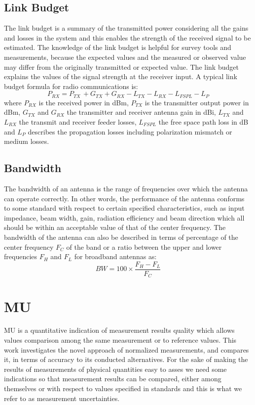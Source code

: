 \subsection{Link Budget}
The link budget is a summary of the transmitted power considering all the gains and losses in the system and this enables the strength of the received signal to be estimated. The knowledge of the link budget is helpful for survey tools and measurements, because the expected values and the measured or observed value may differ from the originally transmitted or expected value. The link budget explains the values of the signal strength at the receiver input. A typical link budget formula for radio communications is:
\begin{equation}
P_{RX}= P_{TX~}+G_{TX}+ G_{RX}-L_{TX}-L_{RX}-L_{FSPL}-L_{P} \label{link_budget}
\end{equation}
where $P_{RX}$ is the received power in dBm, $P_{TX}$ is the transmitter output power in dBm, $G_{TX}$ and $G_{RX}$ the transmitter and receiver antenna gain in dBi, $L_{TX}$ and $L_{RX}$ the transmit and receiver feeder losses, $L_{FSPL}$ the free space path loss in dB and $L_{P}$ describes the propagation losses including polarization mismatch or medium losses.

\subsection{Bandwidth}
The bandwidth of an antenna is the range of frequencies over which the antenna can operate correctly. In other words, the performance of the antenna conforms to some standard with respect to certain specified characteristics, such as input impedance, beam width, gain, radiation efficiency and beam direction which all should be within an acceptable value of that of the center frequency. The bandwidth of the antenna can also be described in terms of percentage of the center frequency $F_{C}$ of the band or a ratio between the upper and lower frequencies $F_{H}$  and $F_{L}$ for broadband antennas as: 
\begin{equation}
BW=100  \times \frac{F_{H}-F_{L}}{F_{C}}
\end{equation}


\section{\acf{MU}}
\acf{MU} is a quantitative indication of measurement results quality which allows values comparison among the same measurement or to reference values. This work investigates the novel approach of normalized measurements, and compares it, in terms of accuracy to its conducted alternatives. For the sake of making the results of measurements of physical quantities easy to asses we need some indications so that measurement results can be compared, either among themselves or with respect to values specified in standards and this is what we refer to as measurement uncertainties. \\

